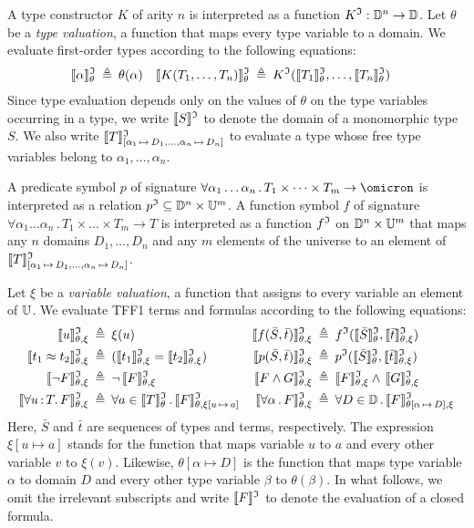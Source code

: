 A type constructor $K$ of arity $n$ is interpreted as a function
$K^{\mathfrak{I}} : \mathbb{D}^n \to \mathbb{D}$.
Let $\theta$ be a {\em type valuation}, a function that maps every
type variable to a domain. We evaluate first-order types according
to the following equations:
\begin{align*}
\llbracket\alpha\rrbracket^{\mathfrak{I}}_{\theta} &\:\triangleq\: \theta(\alpha) &
\llbracket K(T_1,\dots,T_n)\rrbracket^{\mathfrak{I}}_{\theta} &\:\triangleq\: K^{\mathfrak{I}}(\llbracket T_1\rrbracket^{\mathfrak{I}}_{\theta},\dots,\llbracket T_n\rrbracket^{\mathfrak{I}}_{\theta})
\end{align*}
Since type evaluation depends only on the values of $\theta$
on the type variables occurring in a type, we write $\llbracket S\rrbracket^{\mathfrak{I}}$
to denote the domain of a monomorphic type $S$. We also write
$\llbracket T\rrbracket^{\mathfrak{I}}_{[\alpha_1\,\mapsto\,D_1,\dots,\alpha_n\,\mapsto\,D_n]}$
to evaluate a type whose free type variables
belong to $\alpha_1,\dots,\alpha_n$.

A predicate symbol $p$ of signature
$\forall \alpha_1\dots\alpha_n \,.\, T_1 \times \dots \times T_m
\to \omicron$ is interpreted as a relation
$p^{\mathfrak{I}} \subseteq \mathbb{D}^n \times \mathbb{U}^m$.
A function symbol $f$ of signature
$\forall \alpha_1\dots\alpha_n \,.\, T_1 \times \dots \times T_m \to T$
is interpreted as a function
$f^{\mathfrak{I}}$ on $\mathbb{D}^n \times \mathbb{U}^m$ that
maps any $n$ domains $D_1,\dots,D_n$ and
any $m$ elements of the universe
to an element of
$\llbracket T\rrbracket^{\mathfrak{I}}_{[\alpha_1\,\mapsto\,D_1,\dots,\alpha_n\,\mapsto\,D_n]}$.

Let $\xi$ be a {\em variable valuation}, a function that assigns
to every variable an element of $\mathbb{U}$. We evaluate TFF1 terms
and formulas according to the following equations:
\begin{align*}
\eval{u} &\eqdef \xi(u) &
\eval{f(\bar{S},\bar{t})} &\eqdef f^\cI(\evalT{\bar{S}},\eval{\bar{t}}) \\
\eval{t_1 \eq t_2} &\eqdef (\eval{t_1} = \eval{t_2}) &
\eval{p(\bar{S},\bar{t})} &\eqdef p^\cI(\evalT{\bar{S}},\eval{\bar{t}}) \\
\eval{\lnot F} &\eqdef \lnot\, \eval{F} &
\eval{F \land G} &\eqdef \eval{F} \land\, \eval{G} \\
\eval{\forall u \ty T .\, F} &\eqdef \forall {a \in \evalT{T}} \,.\,
\evalG{F}_{\theta,\xi[u\,\mapsto\,a]} &
\eval{\forall \alpha \,.\, F} &\eqdef \forall {D \in \sorts} \,.\,
\evalG{F}_{\theta[\alpha\,\mapsto\,D],\xi} %
\end{align*}
Here, $\bar{S}$ and $\bar{t}$ are sequences of types and terms, respectively.
The expression $\xi[u \mapsto a]$ stands for the function that
maps variable $u$ to $a$ and every other variable $v$ to $\xi(v)$.
Likewise, $\theta[\alpha \mapsto D]$ is the function that maps
type variable $\alpha$ to domain $D$ and every other type
variable $\beta$ to $\theta(\beta)$. In what follows,
we omit the irrelevant subscripts and write $\llbracket F\rrbracket^{\mathfrak{I}}$
to denote the evaluation of a closed formula.

